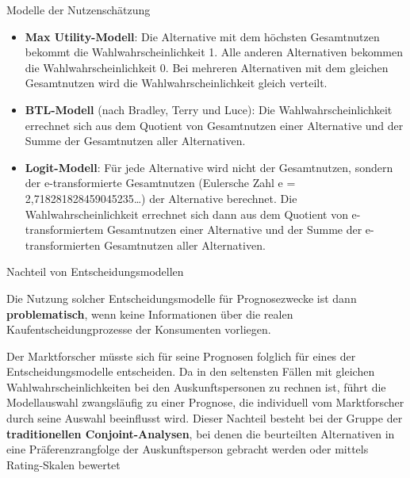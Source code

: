 \documentclass[12pt,ngerman,a4paper,ignorenonframetext,]{beamer}
\providecommand{\tightlist}{%
  \setlength{\itemsep}{0pt}\setlength{\parskip}{0pt}}
\begin{document}
\begin{frame}{Modelle der Nutzenschätzung}
\protect\hypertarget{modelle-der-nutzenschatzung}{}

\begin{itemize}
\tightlist
\item
  \textbf{Max Utility-Modell}: Die Alternative mit dem höchsten
  Gesamtnutzen bekommt die Wahlwahrscheinlichkeit 1. Alle anderen
  Alternativen bekommen die Wahlwahrscheinlichkeit 0. Bei mehreren
  Alternativen mit dem gleichen Gesamtnutzen wird die
  Wahlwahrscheinlichkeit gleich verteilt.
\item
  \textbf{BTL-Modell} (nach Bradley, Terry und Luce): Die
  Wahlwahrscheinlichkeit errechnet sich aus dem Quotient von
  Gesamtnutzen einer Alternative und der Summe der Gesamtnutzen aller
  Alternativen.
\item
  \textbf{Logit-Modell}: Für jede Alternative wird nicht der
  Gesamtnutzen, sondern der e-transformierte Gesamtnutzen (Eulersche
  Zahl e = 2,718281828459045235\ldots{}) der Alternative berechnet. Die
  Wahlwahrscheinlichkeit errechnet sich dann aus dem Quotient von
  e-transformiertem Gesamtnutzen einer Alternative und der Summe der
  e-transformierten Gesamtnutzen aller Alternativen.
\end{itemize}

\end{frame}

\begin{frame}{Nachteil von Entscheidungsmodellen}
\protect\hypertarget{nachteil-von-entscheidungsmodellen}{}

Die Nutzung solcher Entscheidungsmodelle für Prognosezwecke ist dann
\textbf{problematisch}, wenn keine Informationen über die realen
Kaufentscheidungprozesse der Konsumenten vorliegen.

Der Marktforscher müsste sich für seine Prognosen folglich für eines der
Entscheidungsmodelle entscheiden. Da in den seltensten Fällen mit
gleichen Wahlwahrscheinlichkeiten bei den Auskunftspersonen zu rechnen
ist, führt die Modellauswahl zwangsläufig zu einer Prognose, die
individuell vom Marktforscher durch seine Auswahl beeinflusst wird.
Dieser Nachteil besteht bei der Gruppe der \textbf{traditionellen
Conjoint-Analysen}, bei denen die beurteilten Alternativen in eine
Präferenzrangfolge der Auskunftsperson gebracht werden oder mittels
Rating-Skalen bewertet

\end{frame}
\end{document}
